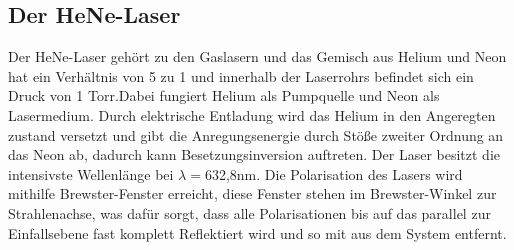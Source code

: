 
\subsection{Der HeNe-Laser}
Der HeNe-Laser gehört zu den Gaslasern und das Gemisch aus Helium und Neon hat ein Verhältnis von 5 zu 1 und innerhalb der Laserrohrs befindet sich ein Druck von 1 Torr.Dabei fungiert Helium als Pumpquelle und Neon als Lasermedium. Durch elektrische Entladung wird das Helium in den Angeregten zustand versetzt und gibt die Anregungsenergie durch Stöße zweiter Ordnung an das Neon ab, dadurch kann Besetzungsinversion auftreten. Der Laser besitzt die intensivste Wellenlänge bei $\lambda=$632,8nm.
Die Polarisation des Lasers wird mithilfe Brewster-Fenster erreicht, diese Fenster stehen im Brewster-Winkel zur Strahlenachse, was dafür sorgt, dass alle Polarisationen  bis auf das parallel zur Einfallsebene fast komplett Reflektiert wird und so mit aus dem System entfernt.
